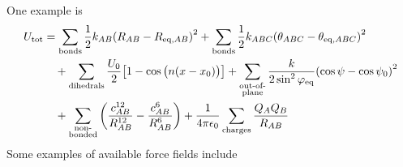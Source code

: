\documentclass[12pt,a4paper,titlepage]{article}
\newcommand{\trm}[1]{\textrm{#1}} %
\newcommand{\en}{\epsilon_{0}} %
\begin{document}
One example is
\begin{equation}
\begin{aligned}
U_{\trm{tot}}&=\sum_{\trm{bonds}}\frac{1}{2}k_{AB}\qty(R_{AB}-R_{\trm{eq},AB})^{2}+\sum_{\trm{bonds}}\frac{1}{2}k_{ABC}\qty(\theta_{ABC}-\theta_{\trm{eq},ABC})^{2}\\
&\quad+\sum_{\trm{dihedrals}}\frac{U_{0}}{2}\qty[1-\cos\big(n(x-x_{0})\big)]+\sum_{\substack{\trm{out-of-}\\\trm{plane}}}\frac{k}{2\sin^{2}\varphi_{\trm{eq}}}\qty(\cos\psi-\cos\psi_{0})^{2}\\
&\quad+\sum_{\substack{\trm{non-}\\\trm{bonded}}}\qty(\frac{c_{AB}^{12}}{R_{AB}^{12}}-\frac{c_{AB}^{6}}{R_{AB}^{6}})+\frac{1}{4\pi\en}\sum_{\trm{charges}}\frac{Q_{A}Q_{B}}{R_{AB}}
\end{aligned}
\end{equation}
Some examples of available force fields include
\end{document}
